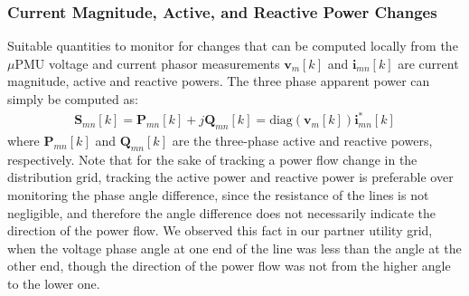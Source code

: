 \documentclass[twocolumn]{IEEEtran}
\newcommand{\mup}{\mu \text{PMU}}
\newcommand{\mr}{\mathrm}
\newcommand{\mb}{\mathbf}
\begin{document}




\subsubsection{Current Magnitude, Active, and Reactive Power Changes} 
Suitable quantities to monitor for changes that can be computed locally from the $\mup$ voltage and current phasor measurements $\mathbf{v}_m[k]$ and $\mathbf{i}_{mn}[k]$ are current magnitude, active and reactive powers. 
The three phase apparent power can simply be computed as: 
\begin{align}
\mb{S}_{mn}[k]=\mb{P}_{mn}[k]+j\mb{Q}_{mn}[k]=\text{diag}(\mathbf{v}_m[k])\mathbf{i}^*_{mn}[k]
\label{eq:complex power}
\end{align}
where $\mb{P}_{mn}[k]$ and $\mb{Q}_{mn}[k]$ are the three-phase active and reactive powers, respectively. Note that for the sake of tracking a power flow change in the distribution grid, tracking the active power and reactive power is preferable over monitoring the phase angle difference, since the resistance of the lines is not negligible, and therefore the angle difference does not necessarily indicate the direction of the power flow. We observed this fact in our partner utility grid, when the voltage phase angle at one end of the line was less than the angle at the other end, though the direction of the power flow was not from the higher angle to the lower one.
\end{document}
